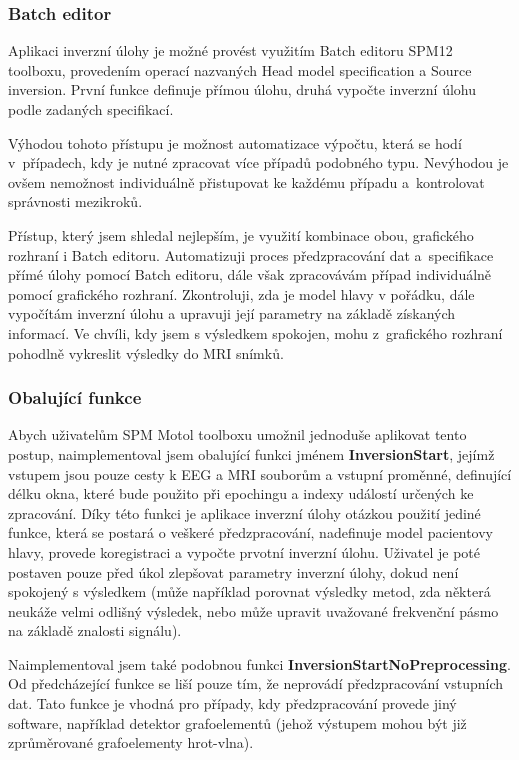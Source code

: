 \subsubsection{Batch editor}
Aplikaci inverzní úlohy je možné provést využitím Batch editoru SPM12 toolboxu, provedením operací nazvaných Head model specification a Source inversion. První funkce definuje přímou úlohu, druhá vypočte inverzní úlohu podle zadaných specifikací.

Výhodou tohoto přístupu je možnost automatizace výpočtu, která se hodí v~případech, kdy je nutné zpracovat více případů podobného typu. Nevýhodou je ovšem nemožnost individuálně přistupovat ke každému případu a~kontrolovat správnosti mezikroků. 

Přístup, který jsem shledal nejlepším, je využití kombinace obou, grafického rozhraní i Batch editoru. Automatizuji proces předzpracování dat a~specifikace přímé úlohy pomocí Batch editoru, dále však zpracovávám případ individuálně pomocí grafického rozhraní. Zkontroluji, zda je model hlavy v pořádku, dále vypočítám inverzní úlohu a upravuji její parametry na základě získaných informací. Ve chvíli, kdy jsem s výsledkem spokojen, mohu z~grafického rozhraní pohodlně vykreslit výsledky do MRI snímků. 


\subsubsection{Obalující funkce }
Abych uživatelům SPM Motol toolboxu umožnil jednoduše aplikovat tento postup, naimplementoval jsem obalující funkci jménem \textbf{InversionStart}, jejímž vstupem jsou pouze cesty k EEG a MRI souborům a vstupní proměnné, definující délku okna, které bude použito při epochingu a indexy událostí určených ke zpracování. Díky této funkci je aplikace inverzní úlohy otázkou použití jediné funkce, která se postará o veškeré předzpracování, nadefinuje model pacientovy hlavy, provede koregistraci a vypočte prvotní inverzní úlohu. Uživatel je poté postaven pouze před úkol zlepšovat parametry inverzní úlohy, dokud není spokojený s výsledkem (může například porovnat výsledky metod, zda některá neukáže velmi odlišný výsledek, nebo může upravit uvažované frekvenční pásmo na základě znalosti signálu).

Naimplementoval jsem také podobnou funkci \textbf{InversionStartNoPreprocessing}. Od předcházející funkce se liší pouze tím, že neprovádí předzpracování vstupních dat. Tato funkce je vhodná pro případy, kdy předzpracování provede jiný software, například detektor grafoelementů (jehož výstupem mohou být již zprůměrované grafoelementy hrot-vlna).

